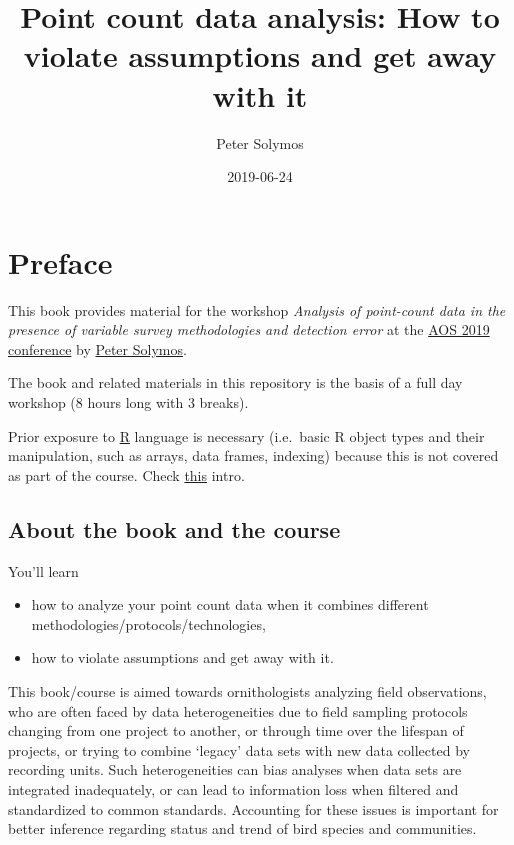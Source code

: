 \documentclass[12pt,]{book}
\title{Point count data analysis: How to violate assumptions and get away with it}
\author{Peter Solymos}
\date{2019-06-24}
\providecommand{\tightlist}{%
  \setlength{\itemsep}{0pt}\setlength{\parskip}{0pt}}
\begin{document}
\maketitle

{
\hypersetup{linkcolor=black}
\setcounter{tocdepth}{2}
\tableofcontents
}
\listoftables
\listoffigures
\hypertarget{foreword}{%
\chapter*{Preface}\label{foreword}}

This book provides material for the workshop
\emph{Analysis of point-count data in the presence of variable survey methodologies and detection error}
at the \href{https://amornithmeeting.org/}{AOS 2019 conference}
by \href{http://peter.solymos.org}{Peter Solymos}.

The book and related materials in this repository is the basis of a
full day workshop (8 hours long with 3 breaks).

Prior exposure to \href{https://www.r-project.org/}{R} language is necessary
(i.e.~basic R object types and their manipulation, such as arrays, data frames, indexing)
because this is not covered as part of the course.
Check \href{_etc/R-basics.pdf}{this} intro.

\hypertarget{about-the-book-and-the-course}{%
\section*{About the book and the course}\label{about-the-book-and-the-course}}

You'll learn

\begin{itemize}
\tightlist
\item
  how to analyze your point count data when it combines different methodologies/protocols/technologies,
\item
  how to violate assumptions and get away with it.
\end{itemize}

This book/course is aimed towards ornithologists analyzing field observations,
who are often faced by data heterogeneities due to
field sampling protocols changing from one project to another,
or through time over the lifespan of projects, or trying to combine
`legacy' data sets with new data collected by recording units.
Such heterogeneities can bias analyses when data sets are integrated
inadequately, or can lead to information loss when filtered and standardized to
common standards. Accounting for these issues is important for better
inference regarding status and trend of bird species and communities.
\end{document}
